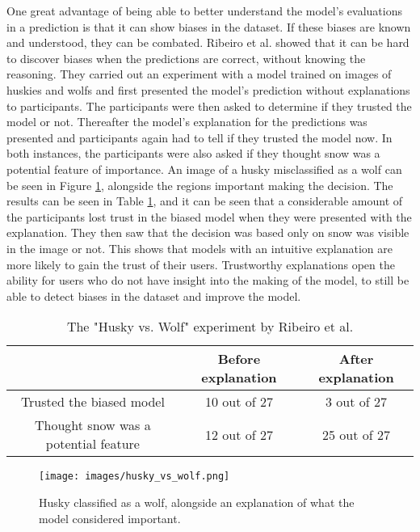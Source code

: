 


One great advantage of being able to better understand the model's evaluations in a prediction is that it can show biases in the dataset. If these biases are known and understood, they can be combated. Ribeiro et al.\cite{ribeiroWhyShouldTrust2016} showed that it can be hard to discover biases when the predictions are correct, without knowing the reasoning. They carried out an experiment with a model trained on images of huskies and wolfs and first presented the model's prediction without explanations to participants. The participants were then asked to determine if they trusted the model or not. Thereafter the model's explanation for the predictions was presented and participants again had to tell if they trusted the model now. In both instances, the participants were also asked if they thought snow was a potential feature of importance. An image of a husky misclassified as a wolf can be seen in Figure \ref{fig:wolf_husky}, alongside the regions important making the decision. The results can be seen in Table \ref{table:husky_vs_wolf}, and it can be seen that a considerable amount of the participants lost trust in the biased model when they were presented with the explanation. They then saw that the decision was based only on snow was visible in the image or not. This shows that models with an intuitive explanation are more likely to gain the trust of their users. Trustworthy explanations open the ability for users who do not have insight into the making of the model, to still be able to detect biases in the dataset and improve the model. 

\begin{table}[htb]
    \centering
    \begin{tabular}{ c c c} 
        \hline
               & Before explanation & After explanation\\ [0.5ex] 
        \hline
            Trusted the biased model & 10 out of 27 & 3 out of 27 \\
            Thought snow was a potential feature & 12 out of 27 & 25 out of 27 \\ [1ex] 
        \hline
    \end{tabular}
    \caption{The "Husky vs. Wolf" experiment by Ribeiro et al.\cite{ribeiroWhyShouldTrust2016}}
    \label{table:husky_vs_wolf}
\end{table}

\begin{figure}[htb]
    \centering
    \texttt{[image: images/husky\_vs\_wolf.png]}
    \caption{Husky classified as a wolf, alongside an explanation of what the model considered important.}
    \label{fig:wolf_husky}
\end{figure}


